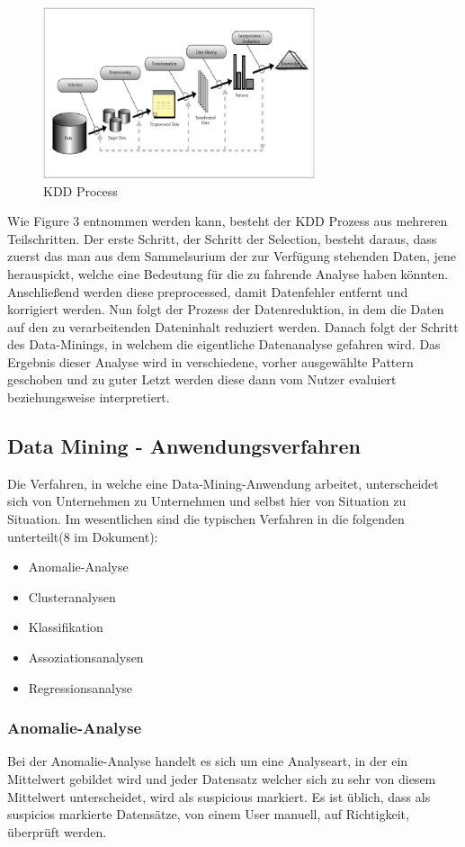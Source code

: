 \documentclass[12pt,twocolumn,twoside]{conference}   %
\begin{document}
\begin{figure}[H]
\centering
\includegraphics[width=8cm]{Abbildungen/KDD.png}
\caption{KDD Process}\label{visina8}
\end{figure}

Wie Figure 3 entnommen werden kann, besteht der KDD Prozess aus mehreren Teilschritten. Der erste Schritt, der Schritt der Selection, besteht daraus, dass zuerst das man aus dem Sammelsurium der zur Verfügung stehenden Daten, jene herauspickt, welche eine Bedeutung für die zu fahrende Analyse haben könnten. Anschließend werden diese preprocessed, damit Datenfehler entfernt und korrigiert werden. Nun folgt der Prozess der Datenreduktion, in dem die Daten auf den zu verarbeitenden Dateninhalt reduziert werden. Danach folgt der Schritt des Data-Minings, in welchem die eigentliche Datenanalyse gefahren wird. Das Ergebnis dieser Analyse wird in verschiedene, vorher ausgewählte Pattern geschoben und zu guter Letzt werden diese dann vom Nutzer evaluiert beziehungsweise interpretiert.

\subsection{Data Mining - Anwendungsverfahren}
Die Verfahren, in welche eine Data-Mining-Anwendung arbeitet, unterscheidet sich von Unternehmen zu Unternehmen und selbst hier von Situation zu Situation. Im wesentlichen sind die typischen Verfahren in die folgenden unterteilt(8 im Dokument):

\begin{itemize}
\item Anomalie-Analyse
\item Clusteranalysen
\item Klassifikation
\item Assoziationsanalysen
\item Regressionsanalyse
\end{itemize}

\subsubsection{Anomalie-Analyse}
Bei der Anomalie-Analyse handelt es sich um eine Analyseart, in der ein Mittelwert gebildet wird und jeder Datensatz welcher sich zu sehr von diesem Mittelwert unterscheidet, wird als suspicious markiert. Es ist üblich, dass als suspicios markierte Datensätze, von einem User manuell, auf Richtigkeit, überprüft werden.
\end{document}

